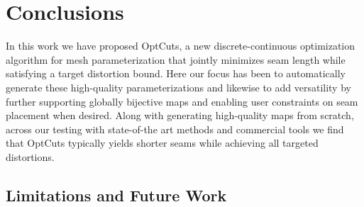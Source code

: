 
\section{Conclusions}
\label{sec:conclusion}

In this work we have proposed OptCuts, a new discrete-continuous optimization algorithm for mesh parameterization that jointly minimizes seam length while satisfying a target distortion bound. Here our focus has been to automatically generate these high-quality parameterizations and likewise to add versatility by further supporting globally bijective maps and enabling user constraints on seam placement when desired. Along with generating high-quality maps from scratch, across our testing with state-of-the art methods and commercial tools we find that OptCuts typically yields shorter seams while achieving all targeted distortions.

\subsection{Limitations and Future Work}

